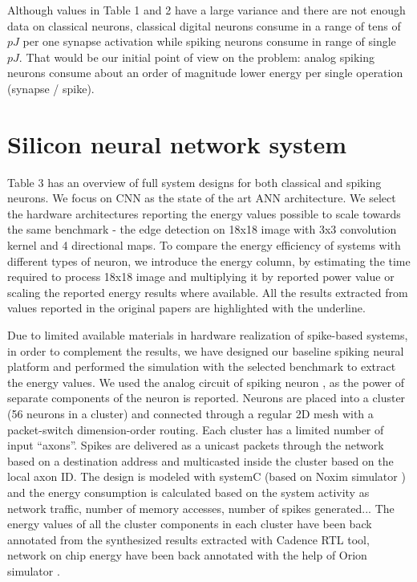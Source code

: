 \documentclass[conference, compsoc]{IEEEtran}
\begin{document}
Although values in Table 1 and 2 have a large variance and there are not enough data on classical neurons, classical digital neurons consume in a range of tens of $ pJ $ per one synapse activation while spiking neurons consume in range of single $ pJ $. That would be our initial point of view on the problem: analog spiking neurons consume about an order of magnitude lower energy per single operation (synapse / spike). 

\section{Silicon neural network system}
Table 3 has an overview of full system designs for both classical and spiking neurons. We focus on CNN as the state of the art ANN architecture. We select the hardware architectures reporting the energy values possible to scale towards the same benchmark - the edge detection on 18x18 image with 3x3 convolution kernel and 4 directional maps. To compare the energy efficiency of systems with different types of neuron, we introduce the energy column, by estimating the time required to process 18x18 image and multiplying it by reported power value or scaling the reported energy results where available. All the results extracted from values reported in the original papers are highlighted with the underline.

Due to limited available materials in hardware realization of spike-based systems, in order to complement the results, we have designed our baseline spiking neural platform and performed the simulation with the selected benchmark to extract the energy values. We used the analog circuit of spiking neuron \cite{Phong}, as the power of separate components of the neuron is reported. Neurons are placed into a cluster (56 neurons in a cluster) and connected through a regular 2D mesh with a packet-switch dimension-order routing. Each cluster has a limited number of input “axons”. Spikes are delivered as a unicast packets through the network based on a destination address and multicasted inside the cluster based on the local axon ID. The design is modeled with systemC (based on Noxim simulator \cite{NOXIM}) and the energy consumption is calculated based on the system activity as network traffic, number of memory accesses, number of spikes generated... The energy values of all the cluster components in each cluster have been back annotated from the synthesized results extracted with Cadence RTL tool, network on chip energy have been back annotated with the help of Orion simulator \cite{Orion}.
\end{document}
